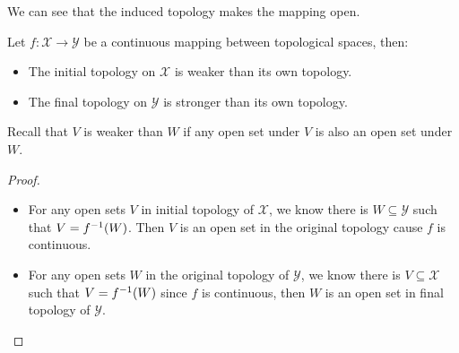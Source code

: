\documentclass[./main.tex]{subfiles}
\begin{document}
We can see that the induced topology makes the mapping open.

\begin{theorem}
  Let $f : \mathcal{X} \rightarrow \mathcal{Y}$ be a continuous mapping between
  topological spaces, then:
  \begin{itemize}
    \item The initial topology on $\mathcal{X}$ is weaker than its own topology.
    \item The final topology on $\mathcal{Y}$ is stronger than its own topology. 
  \end{itemize}
  Recall that $V$ is weaker than $W$ if any open set under $V$ is also an open set under $W$.
\end{theorem}
\begin{proof}
  ~
  \begin{itemize}
    \item For any open sets $V$ in initial topology of $\mathcal{X}$, we know there is
          $W \subseteq \mathcal{Y}$ such that $V = f^{-1}(W)$. Then $V$ is
          an open set in the original topology cause $f$ is continuous.
    \item For any open sets $W$ in the original topology of $\mathcal{Y}$,
          we know there is $V \subseteq \mathcal{X}$ such that $V = f^{-1}(W)$
          since $f$ is continuous, then $W$ is an open set in final topology of $\mathcal{Y}$.
  \end{itemize}
\end{proof}
\end{document}

